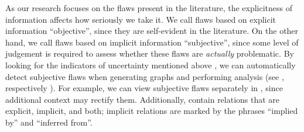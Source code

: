 
As our research focuses on the flaws present in the literature, the
explicitness of information affects how seriously we take it. We call flaws
based on explicit information ``objective'', since they are self-evident in
the literature. On the other hand, we call flaws based on implicit information
``subjective'', since some level of judgement is required to assess whether
these flaws are \emph{actually} problematic. By looking for
the indicators of uncertainty mentioned above \impKeywordsCode{}, we can
automatically detect subjective flaws when generating graphs and performing
analysis (see \ifnotpaper {}, respectively\else
    \fi).
For example, we can view subjective flaws separately in
, since additional context may rectify them.
\ifnotpaper Additionally, 
    contain relations that are explicit, implicit, and both; implicit relations
    are marked by the phrases ``implied by'' and ``inferred from''. \fi

